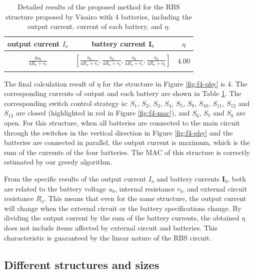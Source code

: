 \documentclass{article}
\begin{document}
\begin{table}[h]
    \caption{Detailed results of the proposed method for the RBS structure proposed by Visairo\cite{visairoReconfigurableBatteryPack2008} with 4 batteries, including the output current, current of each battery, and $\eta$.}
    \label{tab:1}
    \begin{tabular}{ccc}
        \hline
        output current $I_o$       & battery current $\bm{I}_b$       & $\eta$        \\
        \hline\\
        $\displaystyle\frac{4u_b}{4R_o + r_b}$ &  $\displaystyle\left[\frac{u_b}{4R_o + r_b},\frac{u_b}{4R_o + r_b},\frac{u_b}{4R_o + r_b},\frac{u_b}{4R_o + r_b}\right]$   & $4.00$ \\
        \\
        \hline
    \end{tabular}
\end{table}
The final calculation result of $\eta$ for the structure in Figure \ref{fig:f4-phy} is 4.
The corresponding currents of output and each battery are shown in Table \ref{tab:1}.
The corresponding switch control strategy is: $S_1$, $S_2$, $S_3$, $S_4$, $S_5$, $S_9$, $S_{10}$, $S_{11}$, $S_{12}$ and $S_{13}$ are closed (highlighted in red in Figure \ref{fig:f4-mac}), and $S_6$, $S_7$ and $S_8$ are open.
For this structure, when all batteries are connected to the main circuit through the switches in the vertical direction in Figure \ref{fig:f4-phy} and the batteries are connected in parallel, the output current is maximum, which is the sum of the currents of the four batteries.
The MAC of this structure is correctly estimated by our greedy algorithm.


From the specific results of the output current $I_o$ and battery currents $\bm{I}_b$, both are related to the battery voltage $u_b$, internal resistance $r_b$, and external circuit resistance $R_o$.
This means that even for the same structure, the output current will change when the external circuit  or the battery specifications  change.
By dividing the output current by the sum of the battery currents, the obtained $\eta$ does not include items affected by external circuit and batteries.
This characteristic is guaranteed by the linear nature of the RBS circuit.

\subsection{Different structures and sizes}
\end{document}
